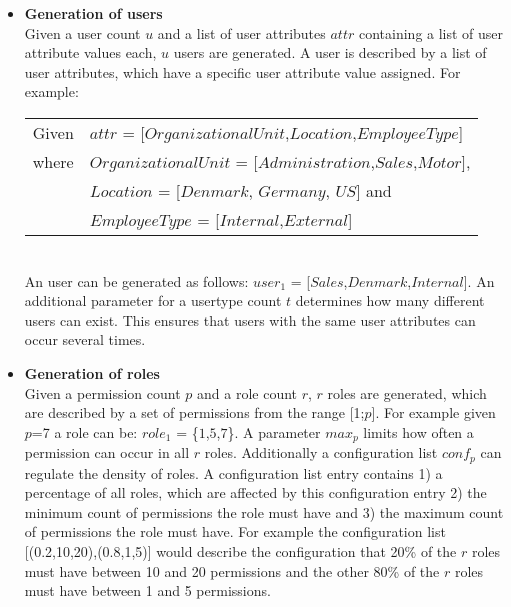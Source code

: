 \begin{itemize}
    \item \textbf{Generation of users}\\
    Given a user count $u$ and a list of user attributes $attr$ containing a list of user attribute values each, $u$ users are generated. A user is described by a list of user attributes, which have a specific user attribute value assigned. For example:\\
    \begin{listliketab}
        \begin{tabular}{ll}
            Given   &  $attr$ = [$OrganizationalUnit$,$Location$,$EmployeeType$]\\
            where   &  $OrganizationalUnit$ = [$Administration$,$Sales$,$Motor$],\\
                    &  $Location$ = [$Denmark$, $Germany$, $US$] and\\
                    &  $EmployeeType$ = [$Internal$,$External$]\\
        \end{tabular}
    \end{listliketab}\\
    An user can be generated as follows: $user_1$ = [$Sales$,$Denmark$,$Internal$]. An additional parameter for a usertype count $t$ determines how many different users can exist. This ensures that users with the same user attributes can occur several times.
    
    \item \textbf{Generation of roles}\\
    Given a permission count $p$ and a role count $r$, $r$ roles are generated, which are described by a set of permissions from the range [1;$p$]. For example given $p$=7 a role can be: $role_1$ = \{$1$,$5$,$7$\}. A parameter $max_p$ limits how often a permission can occur in all $r$ roles. Additionally a configuration list $conf_p$ can regulate the density of roles. A configuration list entry contains 1) a percentage of all roles, which are affected by this configuration entry 2) the minimum count of permissions the role must have and 3) the maximum count of permissions the role must have. For example the configuration list [(0.2,10,20),(0.8,1,5)] would describe the configuration that 20\% of the $r$ roles must have between 10 and 20 permissions and the other 80\% of the $r$ roles must have between 1 and 5 permissions.
    

\end{itemize}
